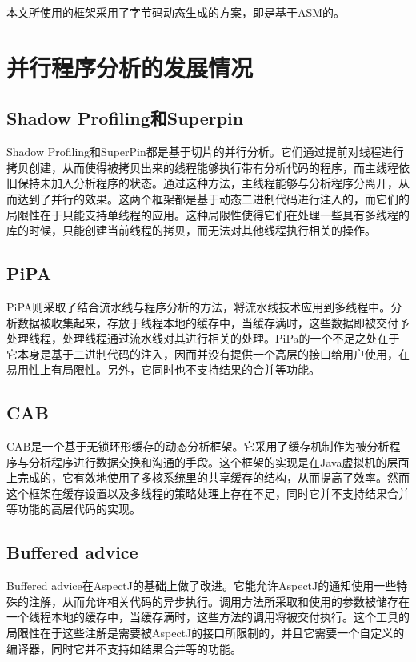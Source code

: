 本文所使用的框架采用了字节码动态生成的方案，即是基于ASM的。

\section{并行程序分析的发展情况}
\subsection{Shadow Profiling和Superpin}

Shadow Profiling\cite{shaPro}和SuperPin\cite{superPin}都是基于切片的并行分析。它们通过提前对线程进行拷贝创建，从而使得被拷贝出来的线程能够执行带有分析代码的程序，而主线程依旧保持未加入分析程序的状态。通过这种方法，主线程能够与分析程序分离开，从而达到了并行的效果。这两个框架都是基于动态二进制代码进行注入的，而它们的局限性在于只能支持单线程的应用。这种局限性使得它们在处理一些具有多线程的库的时候，只能创建当前线程的拷贝，而无法对其他线程执行相关的操作。

\subsection{PiPA}

PiPA\cite{pipa}则采取了结合流水线与程序分析的方法，将流水线技术应用到多线程中。分析数据被收集起来，存放于线程本地的缓存中，当缓存满时，这些数据即被交付予处理线程，处理线程通过流水线对其进行相关的处理。PiPa的一个不足之处在于它本身是基于二进制代码的注入，因而并没有提供一个高层的接口给用户使用，在易用性上有局限性。另外，它同时也不支持结果的合并等功能。

\subsection{CAB}

CAB\cite{CAB}是一个基于无锁环形缓存的动态分析框架。它采用了缓存机制作为被分析程序与分析程序进行数据交换和沟通的手段。这个框架的实现是在Java虚拟机的层面上完成的，它有效地使用了多核系统里的共享缓存的结构，从而提高了效率。然而这个框架在缓存设置以及多线程的策略处理上存在不足，同时它并不支持结果合并等功能的高层代码的实现。

\subsection{Buffered advice}

Buffered advice\cite{bfad}在AspectJ的基础上做了改进。它能允许AspectJ的通知使用一些特殊的注解，从而允许相关代码的异步执行。调用方法所采取和使用的参数被储存在一个线程本地的缓存中，当缓存满时，这些方法的调用将被交付执行。这个工具的局限性在于这些注解是需要被AspectJ的接口所限制的，并且它需要一个自定义的编译器，同时它并不支持如结果合并等的功能。


